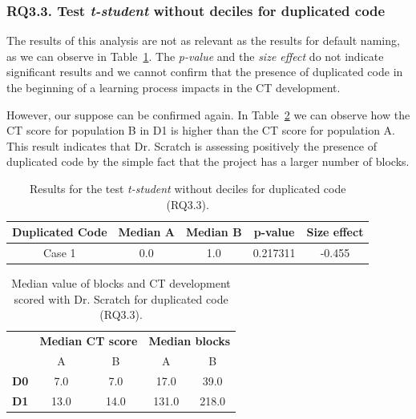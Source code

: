 \subsubsection{RQ3.3. Test \textit{t-student} without deciles for duplicated code}
\label{subsubsec:RQ3_3_statistical_results}

The results of this analysis are not as relevant as the results for default naming, as we can observe in Table~\ref{table:rq3_3_statistical_results}. The \textit{p-value} and the \textit{size effect} do not indicate significant results and we cannot confirm that the presence of duplicated code in the beginning of a learning process impacts in the CT development. 

However, our suppose can be confirmed again. In Table~\ref{table:rq3_3_statistical_results_median} we can observe how the CT score for population B in D1 is higher than the CT score for population A. This result indicates that Dr. Scratch is assessing positively the presence of duplicated code by the simple fact that the project has a larger number of blocks.

\begin{table}
 \begin{center}
  \begin{tabular}{|c|c|c|c|c|}
    \hline
    \textbf{Duplicated Code} & \textbf{Median A} & \textbf{Median B} & \textbf{p-value} & \textbf{Size effect} \\ \hline
    Case 1 & 0.0 & 1.0 & 0.217311 & -0.455 \\ \hline
  \end{tabular}
  \caption{Results for the test \textit{t-student} without deciles for duplicated code (RQ3.3).}
  \label{table:rq3_3_statistical_results}
 \end{center}
\end{table}

\begin{table}
 \begin{center}
  \begin{tabular}{|c|c|c|c|c|}
    \cline{2-5}
     \multicolumn{1}{c}{} & 
     \multicolumn{2}{|c|}{\textbf{Median CT score}} & \multicolumn{2}{|c|}{\textbf{Median blocks}} \\
     \cline{2-5}
     \multicolumn{1}{c|}{} & A & B & A & B \\ \hline
     \textbf{D0} & 7.0 & 7.0 & 17.0 & 39.0 \\ \hline
     \textbf{D1} & 13.0 & 14.0 & 131.0 & 218.0 \\ \hline
  \end{tabular}
  \caption{Median value of blocks and CT development scored with Dr. Scratch for duplicated code (RQ3.3).}
  \label{table:rq3_3_statistical_results_median}
 \end{center}
\end{table}




